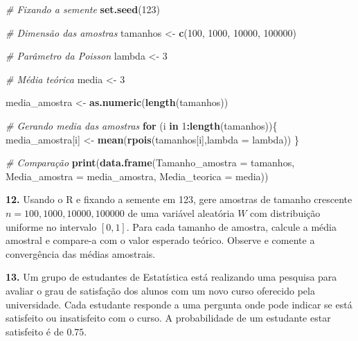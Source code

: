 \documentclass[
]{book}
\newenvironment{Shaded}{\begin{snugshade}}{\end{snugshade}}
\newcommand{\AttributeTok}[1]{\textcolor[rgb]{0.13,0.29,0.53}{#1}}
\newcommand{\CommentTok}[1]{\textcolor[rgb]{0.56,0.35,0.01}{\textit{#1}}}
\newcommand{\ControlFlowTok}[1]{\textcolor[rgb]{0.13,0.29,0.53}{\textbf{#1}}}
\newcommand{\DecValTok}[1]{\textcolor[rgb]{0.00,0.00,0.81}{#1}}
\newcommand{\FunctionTok}[1]{\textcolor[rgb]{0.13,0.29,0.53}{\textbf{#1}}}
\newcommand{\NormalTok}[1]{#1}
\newcommand{\OtherTok}[1]{\textcolor[rgb]{0.56,0.35,0.01}{#1}}
\newcommand{\SpecialCharTok}[1]{\textcolor[rgb]{0.81,0.36,0.00}{\textbf{#1}}}
\begin{document}
\begin{Shaded}
\begin{Highlighting}[]
\CommentTok{\# Fixando a semente}
\FunctionTok{set.seed}\NormalTok{(}\DecValTok{123}\NormalTok{)}

\CommentTok{\# Dimensão das amostras}
\NormalTok{tamanhos }\OtherTok{\textless{}{-}} \FunctionTok{c}\NormalTok{(}\DecValTok{100}\NormalTok{, }\DecValTok{1000}\NormalTok{, }\DecValTok{10000}\NormalTok{, }\DecValTok{100000}\NormalTok{)}

\CommentTok{\# Parâmetro da Poisson}
\NormalTok{lambda }\OtherTok{\textless{}{-}} \DecValTok{3}

\CommentTok{\# Média teórica}
\NormalTok{media }\OtherTok{\textless{}{-}} \DecValTok{3}

\NormalTok{media\_amostra }\OtherTok{\textless{}{-}} \FunctionTok{as.numeric}\NormalTok{(}\FunctionTok{length}\NormalTok{(tamanhos))}

\CommentTok{\# Gerando media das amostras}
\ControlFlowTok{for}\NormalTok{ (i }\ControlFlowTok{in} \DecValTok{1}\SpecialCharTok{:}\FunctionTok{length}\NormalTok{(tamanhos))\{}
\NormalTok{  media\_amostra[i] }\OtherTok{\textless{}{-}} \FunctionTok{mean}\NormalTok{(}\FunctionTok{rpois}\NormalTok{(tamanhos[i],}\AttributeTok{lambda =}\NormalTok{ lambda))}
\NormalTok{\}}

\CommentTok{\# Comparação}
\FunctionTok{print}\NormalTok{(}\FunctionTok{data.frame}\NormalTok{(}\AttributeTok{Tamanho\_amostra =}\NormalTok{ tamanhos, }
                 \AttributeTok{Media\_amostra =}\NormalTok{ media\_amostra,}
                 \AttributeTok{Media\_teorica =}\NormalTok{ media))}
\end{Highlighting}
\end{Shaded}

\textbf{12.} Usando o R e fixando a semente em 123, gere amostras de tamanho
crescente \(n = 100, 1000, 10000, 100000\) de uma variável aleatória \(W\) com distribuição uniforme no intervalo \([0, 1]\). Para cada tamanho de
amostra, calcule a média amostral e compare-a com o valor esperado
teórico. Observe e comente a convergência das médias amostrais.

\textbf{13.} Um grupo de estudantes de Estatística está realizando uma
pesquisa para avaliar o grau de satisfação dos alunos com um novo curso
oferecido pela universidade. Cada estudante responde a uma pergunta onde
pode indicar se está satisfeito ou insatisfeito com o curso. A
probabilidade de um estudante estar satisfeito é de \(0.75\).
\end{document}

